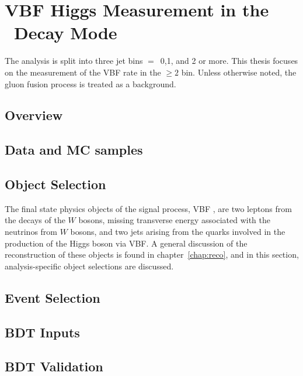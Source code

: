 \chapter{VBF Higgs Measurement in the \wwlnln~Decay Mode}
\label{chap:analysis}

The \hwwlnln analysis is split into three jet bins \Njet$=$~0,1, and 2
or more. This thesis focuses on the measurement of the VBF rate in the
\Njet$\geq{2}$ bin. Unless otherwise noted, the gluon fusion \hww
process is treated as a background. 

\section{Overview}


\section{Data and MC samples}
\label{chap:analysis:sec:data_mc}


\section{Object Selection}
\label{chap:analysis:sec:objects}

The final state physics objects of the signal process, VBF \hwwlnln, are
two leptons from the decays of the $W$ bosons, missing transverse
energy associated with the neutrinos from $W$ bosons, and two
jets arising from the quarks involved in the production of the Higgs
boson via VBF. A general discussion of the reconstruction of these
objects is found in chapter~\ref{chap:reco}, and in this section,
analysis-specific object selections are discussed. 



\section{Event Selection}
\label{chap:analysis:sec:event_selection}


\section{BDT Inputs}
\label{chap:analysis:sec:bdt_inputs}


\section{BDT Validation}
\label{chap:analysis:sec:bdt_validation}


